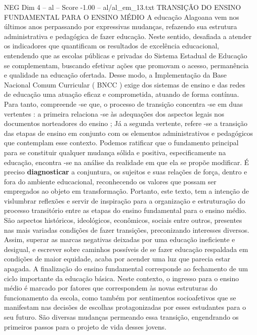 \begin{textsample}{NEG Dim 4 – al – Score -1.00 – al/al\_em\_13.txt}  \label{ex:f4_neg_245}
TRANSIÇÃO DO ENSINO FUNDAMENTAL PARA O ENSINO MÉDIO A educação Alagoana vem nos últimos anos perpassando por expressivas mudanças, refazendo sua estrutura administrativa e pedagógica de fazer educação.
Neste sentido, desafiada a atender os indicadores que quantificam os resultados de excelência educacional, entendendo que as escolas públicas e privadas do Sistema Estadual de Educação se complementam, buscando efetivar ações que promovam o acesso, permanência e qualidade na educação ofertada.
Desse modo, a Implementação da Base Nacional Comum Curricular ( BNCC ) exige dos sistemas de ensino e das redes de educação uma atuação eficaz e comprometida, atuando de forma contínua.
Para tanto, compreende -se que, o processo de transição concentra -se em duas vertentes : a primeira relaciona -se às adequações dos aspectos legais nos documentos norteadores do ensino ; Já a segunda vertente, refere -se a transição das etapas de ensino em conjunto com os elementos administrativos e pedagógicos que contemplam esse contexto.
Podemos ratificar que o fundamento principal para se constituir qualquer mudança sólida e positiva, especificamente na educação, encontra -se na análise da realidade em que ela se propõe modificar.
É preciso \textbf{diagnosticar} a conjuntura, os sujeitos e suas relações de força, dentro e fora do ambiente educacional, reconhecendo os valores que possam ser empregados ao objeto em transformação.
Portanto, este texto, tem a intenção de vislumbrar reflexões e servir de inspiração para a organização e estruturação do processo transitório entre as etapas do ensino fundamental para o ensino médio.
São aspectos históricos, ideológicos, econômicos, sociais entre outros, presentes nas mais variadas condições de fazer transições, preconizando interesses diversos.
Assim, superar as marcas negativas deixadas por uma educação ineficiente e desigual, e escrever sobre caminhos possíveis de se fazer educação respaldada em condições de maior equidade, acaba por acender uma luz que parecia estar apagada.
A finalização do ensino fundamental corresponde ao fechamento de um ciclo importante da educação básica.
Neste contexto, o ingresso para o ensino médio é marcado por fatores que correspondem às novas estruturas do funcionamento da escola, como também por sentimentos socioafetivos que se manifestam nas decisões de escolhas protagonizadas por esses estudantes para o seu futuro.
São diversas mudanças permeando essa transição, engendrando os primeiros passos para o projeto de vida desses jovens.

\end{textsample}
